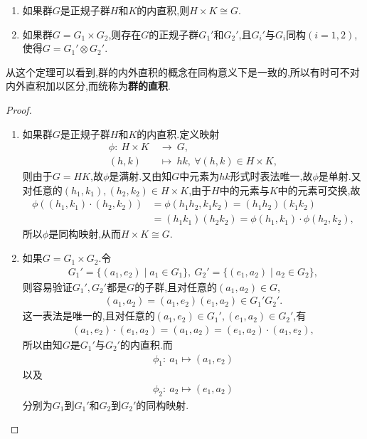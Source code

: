 \documentclass[../../main.tex]{subfiles}%
\begin{document}
\begin{theorem}\label{theorem:两个群的内外直积同构}
\begin{enumerate}[(1)]
\item\label{theorem:两个群的内外直积同构-1} 如果群$G$是正规子群$H$和$K$的内直积,则$H \times K \cong G$.

\item\label{theorem:两个群的内外直积同构-2} 如果群$G = G_1 \times G_2$,则存在$G$的正规子群$G_1'$和$G_2'$,且$G_i'$与$G_i$同构$(i = 1,2)$,使得$G=G_1'\otimes G_2'$.
\end{enumerate}
\end{theorem}
\begin{remark}
从这个定理可以看到,群的内外直积的概念在同构意义下是一致的,所以有时可不对内外直积加以区分,而统称为\textbf{群的直积}.
\end{remark}
\begin{proof}
\begin{enumerate}[(1)]
\item 如果群$G$是正规子群$H$和$K$的内直积.定义映射
\begin{align*}
\phi: \ H \times K \ &\longrightarrow \ G, \\
(h,k) \ &\longmapsto \ hk, \ \forall (h,k) \in H \times K,
\end{align*}
则由于$G = HK$,故$\phi$是满射.又由知$G$中元素为$hk$形式时表法唯一,故$\phi$是单射.又对任意的$(h_1,k_1), (h_2,k_2) \in H \times K$,由于$H$中的元素与$K$中的元素可交换,故
\begin{align*}
\phi((h_1,k_1) \cdot (h_2,k_2)) &= \phi(h_1h_2,k_1k_2) = (h_1h_2)(k_1k_2) \\
&= (h_1k_1)(h_2k_2) = \phi(h_1,k_1) \cdot \phi(h_2,k_2),
\end{align*}
所以$\phi$是同构映射,从而$H \times K \cong G$.

\item 如果$G = G_1 \times G_2$.令
\begin{align*}
G_1' = \{(a_1,e_2) \mid a_1 \in G_1\}, \ G_2' = \{(e_1,a_2) \mid a_2 \in G_2\},
\end{align*}
则容易验证$G_1', G_2'$都是$G$的子群,且对任意的$(a_1,a_2) \in G$,
\begin{align*}
(a_1,a_2) = (a_1,e_2)(e_1,a_2) \in G_1'G_2'.
\end{align*}
这一表法是唯一的,且对任意的$(a_1,e_2) \in G_1', (e_1,a_2) \in G_2'$,有
\begin{align*}
(a_1,e_2) \cdot (e_1,a_2) = (a_1,a_2) = (e_1,a_2) \cdot (a_1,e_2),
\end{align*}
所以由知$G$是$G_1'$与$G_2'$的内直积.而
\begin{align*}
\phi_1: \ a_1 \longmapsto (a_1,e_2)
\end{align*}
以及
\begin{align*}
\phi_2: \ a_2 \longmapsto (e_1,a_2)
\end{align*}
分别为$G_1$到$G_1'$和$G_2$到$G_2'$的同构映射.
\end{enumerate}

\end{proof}
\end{document}
